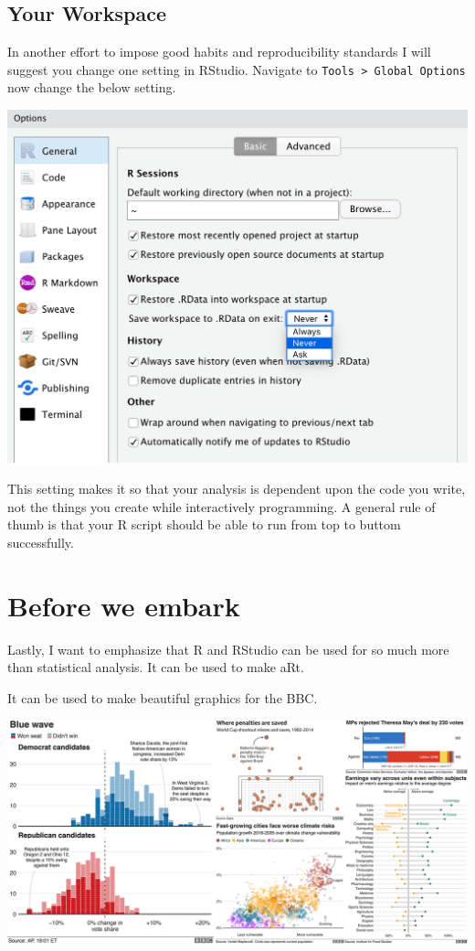 \documentclass[
]{book}
\begin{document}
\hypertarget{your-workspace}{%
\subsection{Your Workspace}\label{your-workspace}}

In another effort to impose good habits and reproducibility standards I will suggest you change one setting in RStudio. Navigate to \texttt{Tools\ \textgreater{}\ Global\ Options} now change the below setting.

\includegraphics{static/save-workspace.png}

This setting makes it so that your analysis is dependent upon the code you write, not the things you create while interactively programming. A general rule of thumb is that your R script should be able to run from top to buttom successfully.

\hypertarget{before-we-embark}{%
\section{Before we embark}\label{before-we-embark}}

Lastly, I want to emphasize that R and RStudio can be used for so much more than statistical analysis. It can be used to make aRt.

It can be used to make beautiful graphics for the BBC.

\includegraphics{static/bbplot_example_plots.png}
\end{document}

